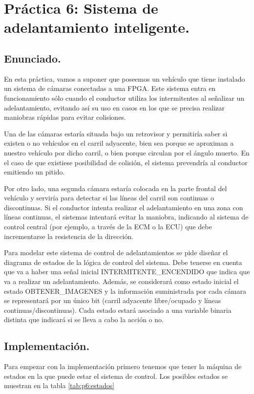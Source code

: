\documentclass{article}
\begin{document}
\section{Práctica 6: Sistema de adelantamiento inteligente.}

\subsection{Enunciado.}

	En esta práctica, vamos a suponer que poseemos un vehículo que tiene instalado un sistema de cámaras conectadas a una FPGA. Este sistema entra en funcionamiento sólo cuando el conductor utiliza los intermitentes al señalizar un adelantamiento, evitando así su uso en casos en los que se precisa realizar maniobras rápidas para evitar colisiones.
	
	Una de las cámaras estaría situada bajo un retrovisor y permitiría saber si existen o no vehículos en el carril adyacente, bien sea porque se aproximan a nuestro vehículo por dicho carril, o bien porque circulan por el ángulo muerto. En el caso de que existiese posibilidad de colisión, el sistema prevendría al conductor emitiendo un pitido.
	
	Por otro lado, una segunda cámara estaría colocada en la parte frontal del vehículo y serviría para detectar si las líneas del carril son continuas o discontinuas. Si el conductor intenta realizar el adelantamiento en una zona con líneas continuas, el sistemas intentará evitar la maniobra, indicando al sistema de control central (por ejemplo, a través de la ECM o la ECU) que debe incrementarse la resistencia de la dirección.

	Para modelar este sistema de control de adelantamientos se pide diseñar el diagrama de estados de la lógica de control del sistema. Debe tenerse en cuenta que va a haber una señal inicial INTERMITENTE\_ENCENDIDO que indica que va a realizar un adelantamiento. Además, se considerará como estado inicial el estado OBTENER\_IMAGENES y la información suministrada por cada cámara se representará por un único bit (carril adyacente libre/ocupado y líneas continuas/discontinuas). Cada estado estará asociado a una variable binaria distinta que indicará si se lleva a cabo la acción o no.

\subsection{Implementación.}
	Para empezar con la implementación primero tenemos que tener la máquina de estados en la que puede estar el sistema de control. Los posibles estados se muestran en la tabla \ref{tab:p6:estados}
	
\end{document}
